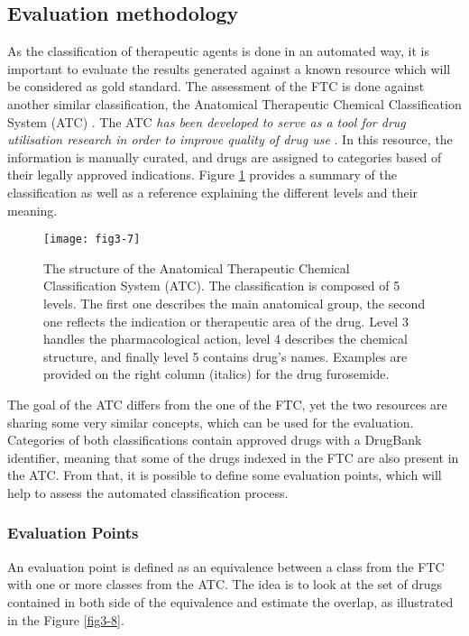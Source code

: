 \subsection{Evaluation methodology}
\label{evaluation}

As the classification of therapeutic agents is done in an automated way, it is important to evaluate the results generated against a known resource which will be considered as gold standard. The assessment of the FTC is done against another similar classification, the Anatomical Therapeutic Chemical Classification System (ATC) \citep{world2006anatomical}. The ATC \emph{has been developed to serve as a tool for drug utilisation research in order to improve quality of drug use} \citep{world2006anatomical}. In this resource, the information is manually curated, and drugs are assigned to categories based of their legally approved indications. Figure \ref{fig3-7} provides a summary of the classification as well as a reference explaining the different levels and their meaning.

\begin{figure}[ht]
    \centering
    \texttt{[image: fig3-7]}
    \caption{The structure of the Anatomical Therapeutic Chemical Classification System (ATC). The classification is composed of 5 levels. The first one describes the main anatomical group, the second one reflects the indication or therapeutic area of the drug. Level 3 handles the pharmacological action, level 4 describes the chemical structure, and finally level 5 contains drug's names. Examples are provided on the right column (italics) for the drug furosemide.}
    \label{fig3-7}
\end{figure}

The goal of the ATC differs from the one of the FTC, yet the two resources are sharing some very similar concepts, which can be used for the evaluation. Categories of both classifications contain approved drugs with a DrugBank identifier, meaning that some of the drugs indexed in the FTC are also present in the ATC. From that, it is possible to define some evaluation points, which will help to assess the automated classification process.

\subsubsection{Evaluation Points}
An evaluation point is defined as an equivalence between a class from the FTC with one or more classes from the ATC. The idea is to look at the set of drugs contained in both side of the equivalence and estimate the overlap, as illustrated in the Figure \ref{fig3-8}.

